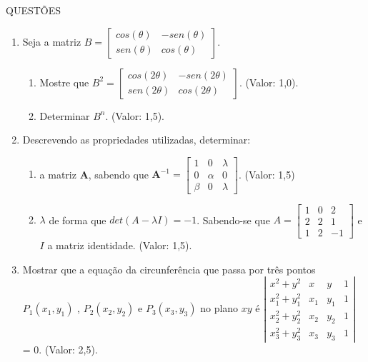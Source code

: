 \documentclass[12pt,a4paper]{article}
\begin{document}
\begin{center} QUESTÕES \end{center}
\begin{enumerate}


\item Seja a matriz  
$\displaystyle 
B = \left[\begin{array}{cc}
cos(\theta)&-sen(\theta)\\
sen(\theta)&cos(\theta)
\end{array} \right]
$.

\begin{enumerate}

\item Mostre que  
$\displaystyle 
B^2 = \left[\begin{array}{cc}
cos(2 \theta) & -sen(2 \theta)\\
sen(2 \theta) & cos(2 \theta )
\end{array} \right]
$.  (Valor: 1,0). 

\item Determinar  
$\displaystyle 
B^n 
$.  (Valor: 1,5).
\end{enumerate}

\item Descrevendo as propriedades utilizadas, determinar:

\begin{enumerate}

\item a matriz \textbf{A}, sabendo que   
$\displaystyle 
\textbf{A}^{-1} = \left[\begin{array}{ccc}
1&0&\lambda\\
0&\alpha&0\\
\beta&0&\lambda
\end{array} \right]
$. (Valor: 1,5)

\item
$\displaystyle 
\lambda
$ de forma que 
$\displaystyle 
det(A - \lambda I) = -1
$. Sabendo-se que  
$\displaystyle 
A = \left[\begin{array}{ccc}1&0&2\\2&2&1\\1&2&-1\end{array}\right]
$ e 
$\displaystyle 
I 
$ a matriz identidade. (Valor: 1,5).
\end{enumerate}

\item Mostrar que a equação da circunferência que passa por três pontos
$\displaystyle P_1(x_1, y_1) $
, $\displaystyle P_2(x_2, y_2) $ 
e $\displaystyle P_3(x_3, y_3) $
no plano 
$\displaystyle xy $ é 
$\left|\begin{array}{cccc}
x^2+y^2&x&y&1\\
x_1^2+y_1^2&x_1&y_1&1\\
x_2^2+y_2^2&x_2&y_2&1\\
x_3^2+y_3^2&x_3&y_3&1
\end{array} \right|$
= 0. (Valor: 2,5).


\end{enumerate}
\end{document}
